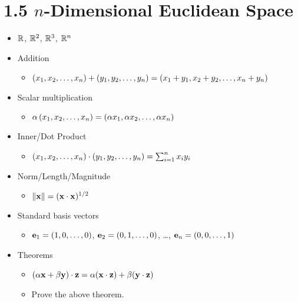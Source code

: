 \documentclass[11pt]{article}
\begin{document}
\section*{1.5 \(n\)-Dimensional Euclidean Space}

\begin{itemize}
  \item \(\mathbb R\), \(\mathbb R^2\), \(\mathbb R^3\), \(\mathbb R^n\)
  \item Addition
    \begin{itemize}
      \item
        \(
          \left(x_1,x_2,\dots,x_n\right) + \left(y_1,y_2,\dots,y_n\right)
            =
          \left(x_1+y_1,x_2+y_2,\dots,x_n+y_n\right)
        \)
    \end{itemize}
  \item Scalar multiplication
    \begin{itemize}
      \item
        \(
          \alpha\left(x_1,x_2,\dots,x_n\right)
            =
          \left(\alpha x_1,\alpha x_2,\dots,\alpha x_n\right)
        \)
    \end{itemize}
  \item Inner/Dot Product
    \begin{itemize}
      \item
        \(
          \left(x_1,x_2,\dots,x_n\right)\cdot\left(y_1,y_2,\dots,y_n\right)
            =
          \sum_{i=1}^n x_iy_i
        \)
    \end{itemize}
  \item Norm/Length/Magnitude
    \begin{itemize}
      \item
        \(
          \|\mathbf{x}\| = (\mathbf{x}\cdot\mathbf{x})^{1/2}
        \)
    \end{itemize}
  \item Standard basis vectors
    \begin{itemize}
      \item
        \(
          \mathbf{e}_1=\left(1,0,\dots,0\right)
        \),
        \(
          \mathbf{e}_2=\left(0,1,\dots,0\right)
        \), \dots,
        \(
          \mathbf{e}_n=\left(0,0,\dots,1\right)
        \)
    \end{itemize}
  \item Theorems
    \begin{itemize}
      \item
        \(
          (\alpha\mathbf{x}+\beta\mathbf{y})\cdot\mathbf{z}
            =
          \alpha(\mathbf{x}\cdot\mathbf{z}) + \beta(\mathbf{y}\cdot\mathbf{z})
        \)
      \item Prove the above theorem.

\end{itemize}
\end{itemize}
\end{document}
